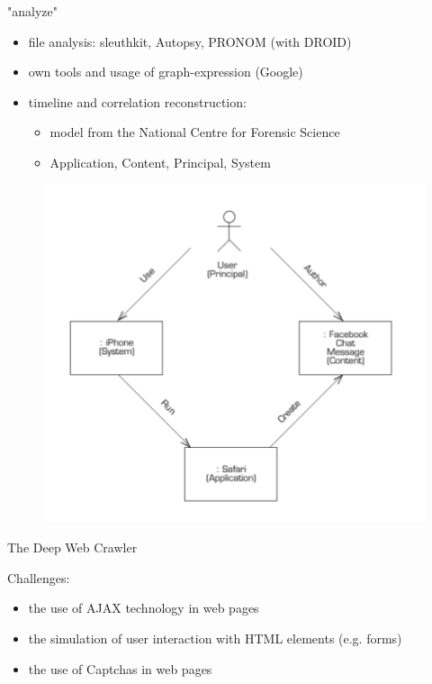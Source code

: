 \documentclass{beamer}
\begin{document}
\begin{frame}{"analyze"}

\begin{itemize}
  \item file analysis: sleuthkit, Autopsy, PRONOM (with DROID)
  \item own tools and usage of graph-expression (Google)
  \item timeline and correlation reconstruction:
  \begin{itemize}
  	\item model from the National Centre for Forensic Science
	\item Application, Content, Principal, System
  \end{itemize}
\end{itemize}

\begin{figure}
\includegraphics[scale=0.4]{model2.png}
\end{figure}

\end{frame}

\begin{frame}{The Deep Web Crawler}

Challenges:

\begin{itemize}
  \item the use of AJAX technology in web pages
  \item the simulation of user interaction with HTML elements (e.g. forms)
  \item the use of Captchas in web pages
\end{itemize}

\end{frame}
\end{document}
